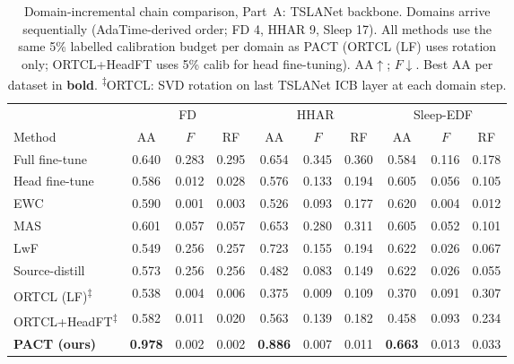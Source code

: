 \begin{table}[t]
\centering
\caption{Domain-incremental chain comparison, Part~A: TSLANet backbone.
Domains arrive sequentially (AdaTime-derived order; FD 4, HHAR 9, Sleep 17).
All methods use the same 5\% labelled calibration budget per domain as PACT
(ORTCL (LF) uses rotation only; ORTCL+HeadFT uses 5\% calib for head fine-tuning).
AA$\uparrow$; $F$$\downarrow$. Best AA per dataset in \textbf{bold}.
\textsuperscript{$\ddagger$}ORTCL: SVD rotation on last TSLANet ICB layer at each domain step.}
\label{tab:chain-tslanet}
\small
\begin{tabular}{l ccc ccc ccc}
\toprule
& \multicolumn{3}{c}{FD} & \multicolumn{3}{c}{HHAR} & \multicolumn{3}{c}{Sleep-EDF}\\
\cmidrule(lr){2-4}\cmidrule(lr){5-7}\cmidrule(lr){8-10}
Method & AA & $F$ & RF & AA & $F$ & RF & AA & $F$ & RF\\
\midrule
Full fine-tune & 0.640 & 0.283 & 0.295 & 0.654 & 0.345 & 0.360 & 0.584 & 0.116 & 0.178\\
Head fine-tune & 0.586 & 0.012 & 0.028 & 0.576 & 0.133 & 0.194 & 0.605 & 0.056 & 0.105\\
EWC & 0.590 & 0.001 & 0.003 & 0.526 & 0.093 & 0.177 & 0.620 & 0.004 & 0.012\\
MAS & 0.601 & 0.057 & 0.057 & 0.653 & 0.280 & 0.311 & 0.605 & 0.052 & 0.101\\
LwF & 0.549 & 0.256 & 0.257 & 0.723 & 0.155 & 0.194 & 0.622 & 0.026 & 0.067\\
Source-distill & 0.573 & 0.256 & 0.256 & 0.482 & 0.083 & 0.149 & 0.622 & 0.026 & 0.055\\
ORTCL (LF)\textsuperscript{$\ddagger$} & 0.538 & 0.004 & 0.006 & 0.375 & 0.009 & 0.109 & 0.370 & 0.091 & 0.307\\
ORTCL+HeadFT\textsuperscript{$\ddagger$} & 0.582 & 0.011 & 0.020 & 0.563 & 0.139 & 0.182 & 0.458 & 0.093 & 0.234\\
\textbf{PACT (ours)} & \textbf{0.978} & 0.002 & 0.002 & \textbf{0.886} & 0.007 & 0.011 & \textbf{0.663} & 0.013 & 0.033\\
\bottomrule
\end{tabular}
\end{table}


